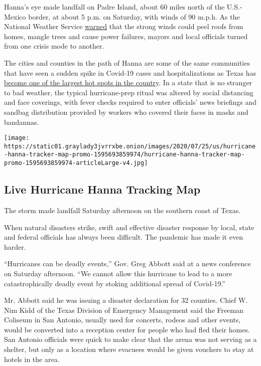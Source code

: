 Hanna's eye made landfall on Padre Island, about 60 miles north of the
U.S.-Mexico border, at about 5 p.m. on Saturday, with winds of 90 m.p.h.
As the National Weather Service
\href{https://forecast.weather.gov/showsigwx.php?warnzone=TXZ242\&warncounty=TXC273\&firewxzone=TXZ242\&local_place1=3\%20Miles\%20NNE\%20Kingsville,\%20Naval\%20Air\%20Station\%20TX\&product1=Hurricane+Warning\#.XxxWW55KjIV}{warned}
that the strong winds could peel roofs from homes, mangle trees and
cause power failures, mayors and local officials turned from one crisis
mode to another.

The cities and counties in the path of Hanna are some of the same
communities that have seen a sudden spike in Covid-19 cases and
hospitalizations as Texas has
\href{https://www.nytimes3xbfgragh.onion/interactive/2020/us/texas-coronavirus-cases.html}{become
one of the largest hot spots in the country}. In a state that is no
stranger to bad weather, the typical hurricane-prep ritual was altered
by social distancing and face coverings, with fever checks required to
enter officials' news briefings and sandbag distribution provided by
workers who covered their faces in masks and bandannas.

\href{https://www.nytimes3xbfgragh.onion/interactive/2020/07/25/us/hurricane-hanna-tracker-map.html}{}

\texttt{[image: https://static01.graylady3jvrrxbe.onion/images/2020/07/25/us/hurricane-hanna-tracker-map-promo-1595693859974/hurricane-hanna-tracker-map-promo-1595693859974-articleLarge-v4.jpg]}

\hypertarget{live-hurricane-hanna-tracking-map}{%
\subsection{Live Hurricane Hanna Tracking
Map}\label{live-hurricane-hanna-tracking-map}}

The storm made landfall Saturday afternoon on the southern coast of
Texas.

When natural disasters strike, swift and effective disaster response by
local, state and federal officials has always been difficult. The
pandemic has made it even harder.

``Hurricanes can be deadly events,'' Gov. Greg Abbott said at a news
conference on Saturday afternoon. ``We cannot allow this hurricane to
lead to a more catastrophically deadly event by stoking additional
spread of Covid-19.''

Mr. Abbott said he was issuing a disaster declaration for 32 counties.
Chief W. Nim Kidd of the Texas Division of Emergency Management said the
Freeman Coliseum in San Antonio, usually used for concerts, rodeos and
other events, would be converted into a reception center for people who
had fled their homes. San Antonio officials were quick to make clear
that the arena was not serving as a shelter, but only as a location
where evacuees would be given vouchers to stay at hotels in the area.

